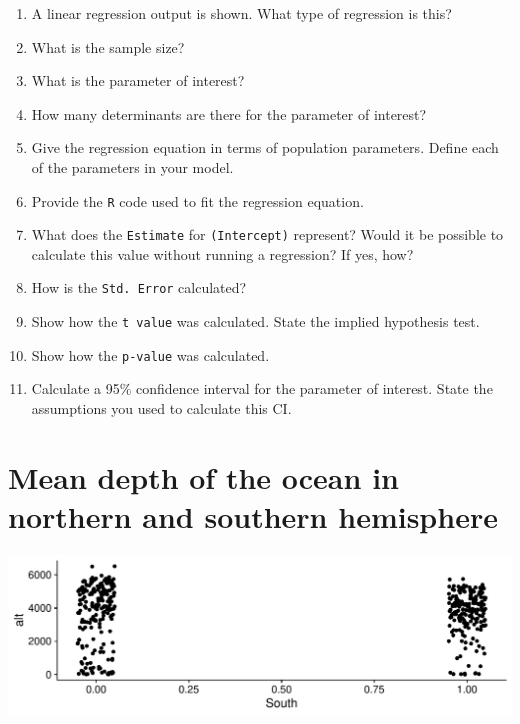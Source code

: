 \documentclass[landscape,twocolumn,letterpaper,9pt,reqno]{article}\usepackage[]{graphicx}\usepackage[]{color}
\newenvironment{knitrout}{}{} %
\newcommand{\compresslist}{ %
	\setlength{\itemsep}{1pt}
	\setlength{\parskip}{0pt}
	\setlength{\parsep}{0pt}
}
\begin{document}
\begin{enumerate}\compresslist
	\item A linear regression output is shown. What type of regression is this?
	\item What is the sample size? 
	\item What is the parameter of interest?
	\item How many determinants are there for the parameter of interest?
	\item Give the regression equation in terms of population parameters. Define each of the parameters in your model.
		\item Provide the \texttt{R} code used to fit the regression equation.
	\item What does the \texttt{Estimate} for \texttt{(Intercept)} represent? Would it be possible to calculate this value without running a regression? If yes, how?
	\item How is the \texttt{Std. Error} calculated?
	\item Show how the \texttt{t value} was calculated. State the implied hypothesis test. 
	\item Show how the \texttt{p-value} was calculated.
	\item Calculate a 95\% confidence interval for the parameter of interest. State the assumptions you used to calculate this CI.
\end{enumerate}



\clearpage

\section{Mean depth of the ocean in northern and southern hemisphere}

\begin{knitrout}
\color{fgcolor}

{\centering \includegraphics[width=1\linewidth]{figure/unnamed-chunk-4-1} 

}



\end{knitrout}
\end{document}
